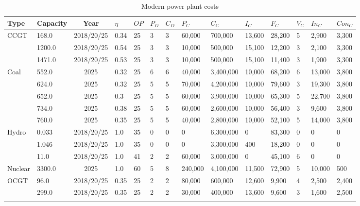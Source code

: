 \begin{table*}[]
	\caption{Modern power plant costs \cite{Department2016}}
	\begin{tabularx}{\linewidth}{|p{}|l|c|l|l|l|l|l|l|l|l|l|l|l|}
\hline
Type & Capacity & Year & $\eta$ & $OP$ & $P_D$ & $C_D$ & $P_C$ & $C_C$ & $I_C$ & $F_C$ & $V_C$ & $In_C$ & $Con_C$ \\ \hline
\multirow{3}{*}{CCGT} & 168.0 & 2018/20/25 & 0.34 & 25 & 3 & 3 & 60,000 & 700,000 & 13,600 & 28,200 & 5 & 2,900 & 3,300 \\ \cline{2-14} 
& 1200.0 & 2018/20/25 & 0.54 & 25 & 3 & 3 & 10,000 & 500,000 & 15,100 & 12,200 & 3 & 2,100 & 3,300 \\ \cline{2-14} 
& 1471.0 & 2018/20/25 & 0.53 & 25 & 3 & 3 & 10,000 & 500,000 & 15,100 & 11,400 & 3 & 1,900 & 3,300 \\ \hline
\multirow{5}{*}{Coal} & 552.0 & 2025 & 0.32 & 25 & 6 & 6 & 40,000 & 3,400,000 & 10,000 & 68,200 & 6 & 13,000 & 3,800 \\ \cline{2-14} 
& 624.0 & 2025 & 0.32 & 25 & 5 & 5 & 70,000 & 4,200,000 & 10,000 & 79,600 & 3 & 19,300 & 3,800 \\ \cline{2-14} 
& 652.0 & 2025 & 0.3 & 25 & 5 & 5 & 60,000 & 3,900,000 & 10,000 & 65,300 & 5 & 22,700 & 3,800 \\ \cline{2-14} 
& 734.0 & 2025 & 0.38 & 25 & 5 & 5 & 60,000 & 2,600,000 & 10,000 & 56,400 & 3 & 9,600 & 3,800 \\ \cline{2-14} 
& 760.0 & 2025 & 0.35 & 25 & 5 & 5 & 40,000 & 2,800,000 & 10,000 & 52,100 & 5 & 14,000 & 3,800 \\ \hline
\multirow{3}{*}{Hydro} & 0.033 & 2018/20/25 & 1.0 & 35 & 0 & 0 & 0 & 6,300,000 & 0 & 83,300 & 0 & 0 & 0 \\ \cline{2-14} 
& 1.046 & 2018/20/25 & 1.0 & 35 & 0 & 0 & 0 & 3,300,000 & 400 & 18,200 & 0 & 0 & 0 \\ \cline{2-14} 
& 11.0 & 2018/20/25 & 1.0 & 41 & 2 & 2 & 60,000 & 3,000,000 & 0 & 45,100 & 6 & 0 & 0 \\ \hline
Nuclear & 3300.0 & 2025 & 1.0 & 60 & 5 & 8 & 240,000 & 4,100,000 & 11,500 & 72,900 & 5 & 10,000 & 500 \\ \hline
\multirow{5}{*}{OCGT} & 96.0 & 2018/20/25 & 0.35 & 25 & 2 & 2 & 80,000 & 600,000 & 12,600 & 9,900 & 4 & 2,500 & 2,400 \\ \cline{2-14} 
& 299.0 & 2018/20/25 & 0.35 & 25 & 2 & 2 & 30,000 & 400,000 & 13,600 & 9,600 & 3 & 1,600 & 2,500 \\ \cline{2-14} 

\end{tabularx}
\end{table*}
